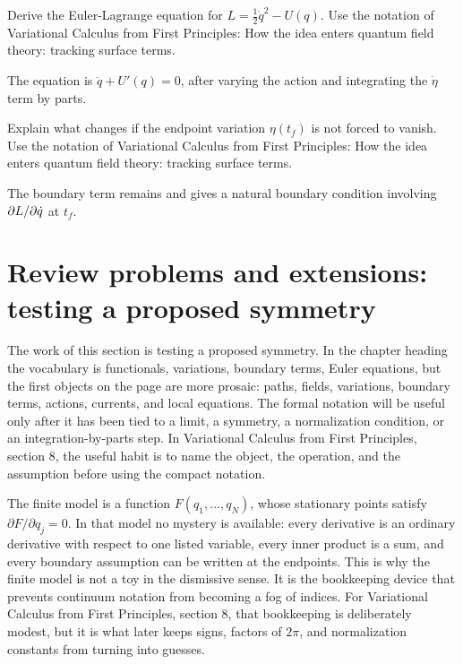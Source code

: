\begin{exercise}
Derive the Euler-Lagrange equation for \(L=\frac12\dot q^2-U(q)\).  Use the notation of Variational Calculus from First Principles: How the idea enters quantum field theory: tracking surface terms.
\begin{answer}
The equation is \(\ddot q+U'(q)=0\), after varying the action and integrating the \(\dot\eta\) term by parts.
\end{answer}
\end{exercise}

\begin{exercise}
Explain what changes if the endpoint variation \(\eta(t_f)\) is not forced to vanish.  Use the notation of Variational Calculus from First Principles: How the idea enters quantum field theory: tracking surface terms.
\begin{answer}
The boundary term remains and gives a natural boundary condition involving \(\partial L/\partial\dot q\) at \(t_f\).
\end{answer}
\end{exercise}



\section{Review problems and extensions: testing a proposed symmetry}

The work of this section is testing a proposed symmetry.  In the chapter heading the vocabulary is functionals, variations, boundary terms, Euler equations, but the first objects on the page are more prosaic: paths, fields, variations, boundary terms, actions, currents, and local equations.  The formal notation will be useful only after it has been tied to a limit, a symmetry, a normalization condition, or an integration-by-parts step.  In Variational Calculus from First Principles, section 8, the useful habit is to name the object, the operation, and the assumption before using the compact notation.

The finite model is a function \(F(q_1,\ldots,q_N)\), whose stationary points satisfy \( \partial F/\partial q_j=0 \).  In that model no mystery is available: every derivative is an ordinary derivative with respect to one listed variable, every inner product is a sum, and every boundary assumption can be written at the endpoints.  This is why the finite model is not a toy in the dismissive sense.  It is the bookkeeping device that prevents continuum notation from becoming a fog of indices.  For Variational Calculus from First Principles, section 8, that bookkeeping is deliberately modest, but it is what later keeps signs, factors of \(2\pi\), and normalization constants from turning into guesses.

